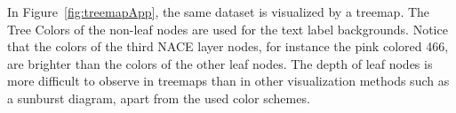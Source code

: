 \documentclass[journal]{vgtc}                %
\begin{document}
In Figure~\ref{fig:treemapApp}, the same dataset is visualized by a treemap. The Tree Colors of the non-leaf nodes are used for the text label
 backgrounds. Notice that the colors of the third NACE layer nodes, for instance the pink colored 466, are brighter than the colors of the other leaf nodes. The depth of leaf nodes is more difficult to observe in treemaps than in other visualization methods such as a sunburst diagram, apart from the used color schemes.








\end{document}
